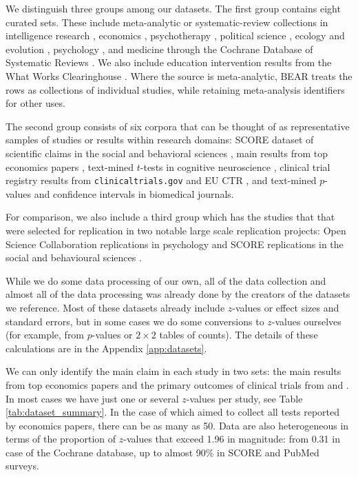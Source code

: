\documentclass[11pt]{article}
\begin{document}
We distinguish three groups among our datasets. The first group contains eight curated sets. These include meta-analytic or systematic-review collections in intelligence research \parencite{nuijten2020intelligence}, economics \parencite{askarov2023significance}, psychotherapy \parencite{cuijpers2024effects}, political science \parencite{arel2022quantitative}, ecology and evolution \parencite{costello2022decline,yang2024large}, psychology \parencite{rodriguez2022psymetadata}, and medicine through the Cochrane Database of Systematic Reviews \parencite{schwab2024cochrane,cochrane2025cdsr}. We also include education intervention results from the What Works Clearinghouse \parencite{wwc2025studyfindings}. Where the source is meta-analytic, BEAR treats the rows as collections of individual studies, while retaining meta-analysis identifiers for other uses.

The second group consists of six corpora that can be thought of as representative samples of studies or results within research domains: SCORE dataset of scientific claims in the social and behavioral sciences \parencite{tyner2026}, main results from top economics papers \parencite{lang2025credible}, text-mined $t$-tests in cognitive neuroscience \parencite{szucs2017empirical}, clinical trial registry results from \texttt{clinicaltrials.gov} and EU CTR \parencite{clinicaltrials2025, euctr2025}, and text-mined $p$-values \parencite{chavalarias2016evolution} and confidence intervals \parencite{barnett2019examination} in biomedical journals.

For comparison, we also include a third group which has the studies that that were selected for replication in two notable large scale replication projects: Open Science Collaboration replications in psychology \parencite{opensciencecollaborationEstimatingReproducibilityPsychological2015a} and SCORE replications in the social and behavioural sciences \parencite{tyner2026}. 



While we do some data processing of our own, all of the data collection and almost all of the data processing was already done by the creators of the datasets we reference. Most of these datasets already include $z$-values or effect sizes and standard errors, but in some cases we do some conversions to $z$-values ourselves (for example, from $p$-values or $2 \times 2$ tables of counts). The details of these calculations are in the Appendix \ref{app:datasets}. 

We can only identify the main claim in each study in two sets: the main results from top economics papers \textcite{lang2025credible} and the primary outcomes of  clinical trials from \textcite{clinicaltrials2025} and \textcite{euctr2025}.  In most cases we have just one or several $z$-values per study, see Table \ref{tab:dataset_summary}. In the case of \textcite{arel2022quantitative} which aimed to collect all tests reported by economics papers, there can be as many as 50. Data are also heterogeneous in terms of the proportion of $z$-values that exceed 1.96 in magnitude: from 0.31 in case of the Cochrane database, up to almost 90\% in SCORE and PubMed surveys.
\end{document}
